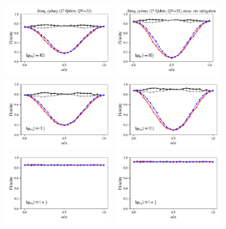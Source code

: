 \documentclass[a4paper]{article}
\begin{document}
\begin{figure}[H]
	\centering
	\includegraphics[width=0.35\textwidth]{fidelity_qc1_mit1_state0}
	\includegraphics[width=0.35\textwidth]{fidelity_qc1_mit0_state0}
	\\
	\includegraphics[width=0.35\textwidth]{fidelity_qc1_mit1_state1}
	\includegraphics[width=0.35\textwidth]{fidelity_qc1_mit0_state1}
	\\
	\includegraphics[width=0.35\textwidth]{fidelity_qc1_mit1_state2}
	\includegraphics[width=0.35\textwidth]{fidelity_qc1_mit0_state2}

\end{figure}
\end{document}
